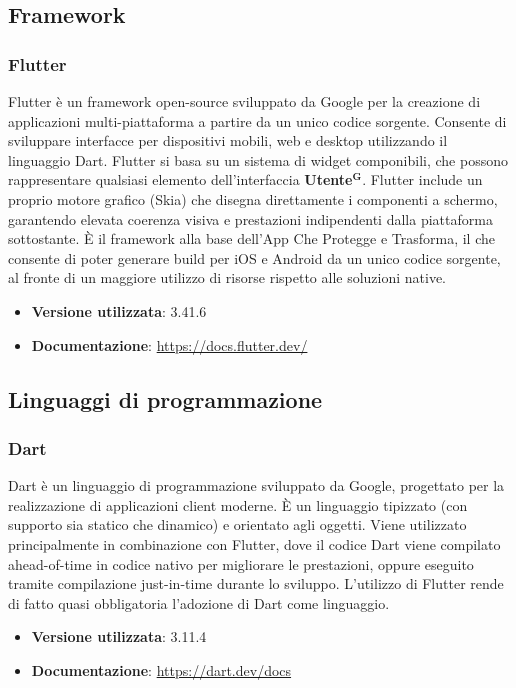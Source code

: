 \documentclass[a4paper,12pt]{article}
\newcommand{\term}[1]{\textbf{#1}$^\mathbf{G}$}
\begin{document}
\subsection{Framework} \label{subsec:framework}

\subsubsection{Flutter}
Flutter è un framework open-source sviluppato da Google per la creazione di applicazioni multi-piattaforma a partire da un unico codice sorgente. Consente di sviluppare interfacce per dispositivi mobili, web e desktop utilizzando il linguaggio Dart. Flutter si basa su un sistema di widget componibili, che possono rappresentare qualsiasi elemento dell’interfaccia \term{Utente}. Flutter include un proprio motore grafico (Skia) che disegna direttamente i componenti a schermo, garantendo elevata coerenza visiva e prestazioni indipendenti dalla piattaforma sottostante. È il framework alla base dell'App Che Protegge e Trasforma, il che consente di poter generare build per iOS e Android da un unico codice sorgente, al fronte di un maggiore utilizzo di risorse rispetto alle soluzioni native.
\begin{itemize}
    \item \textbf{Versione utilizzata}: 3.41.6
    \item \textbf{Documentazione}: \url{https://docs.flutter.dev/}
\end{itemize}

\subsection{Linguaggi di programmazione} \label{subsec:linguaggi}

\subsubsection{Dart}
Dart è un linguaggio di programmazione sviluppato da Google, progettato per la realizzazione di applicazioni client moderne. È un linguaggio tipizzato (con supporto sia statico che dinamico) e orientato agli oggetti. Viene utilizzato principalmente in combinazione con Flutter, dove il codice Dart viene compilato  ahead-of-time in codice nativo per migliorare le prestazioni, oppure eseguito tramite compilazione just-in-time durante lo sviluppo. L'utilizzo di Flutter rende di fatto quasi obbligatoria l'adozione di Dart come linguaggio.
\begin{itemize}
    \item \textbf{Versione utilizzata}: 3.11.4
    \item \textbf{Documentazione}: \url{https://dart.dev/docs}
\end{itemize}
\end{document}
